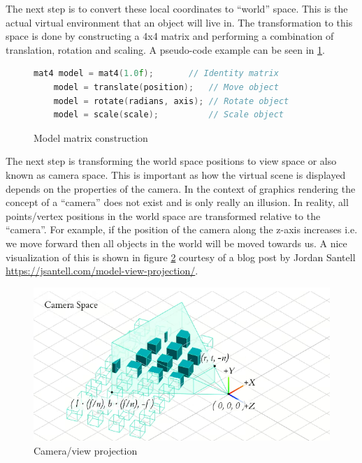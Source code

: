 \documentclass[11pt]{article}
\begin{document}
The next step is to convert these local coordinates to ``world'' space. This is
the actual virtual environment that an object will live in. The transformation
to this space is done by constructing a 4x4 matrix and performing a combination
of translation, rotation and scaling. A pseudo-code example can be seen in
\ref{fig:local_to_world}.

\begin{figure}[ht]
  \centering
  \begin{lstlisting}[language=C++]
    mat4 model = mat4(1.0f);       // Identity matrix
    model = translate(position);   // Move object
    model = rotate(radians, axis); // Rotate object
    model = scale(scale);          // Scale object
  \end{lstlisting}
  \caption{Model matrix construction}
  \label{fig:local_to_world}
\end{figure}
  

The next step is transforming the world space positions to view space or also
known as camera space. This is important as how the virtual scene is displayed
depends on the properties of the camera. In the context of graphics rendering
the concept of a ``camera'' does not exist and is only really an illusion. In
reality, all points/vertex positions in the world space are transformed relative
to the ``camera''. For example, if the position of the camera along the z-axis
increases i.e. we move forward then all objects in the world will be moved
towards us. A nice visualization of this is shown in figure
\ref{fig:camera_projection} courtesy of a blog post by Jordan Santell
\href{https://jsantell.com/model-view-projection/}{https://jsantell.com/model-view-projection/}.

\begin{figure}[H]
  \centering
  \includegraphics[width=\textwidth]{images/camera_space.png}
  \caption{Camera/view projection \cite{camera_projection}}
  \label{fig:camera_projection} 
\end{figure}
\end{document}
